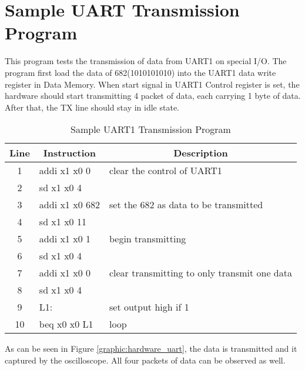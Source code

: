 \newpage
\section{Sample UART Transmission Program}
This program tests the transmission of data from UART1 on special I/O.
The program first load the data of 682(1010101010) into the UART1 data write register in Data Memory.
When start signal in UART1 Control register is set, the hardware should start transmitting 4 packet of data, each carrying 1 byte of data.
After that, the TX line should stay in idle state.

\begin{table}[!h]
    \centering
    \caption{Sample UART1 Transmission Program}
    \label{program:sample_uart}
    \begin{tabular}{|c|l|l|}
        \hline
        \textbf{Line} & \multicolumn{1}{c|}{\textbf{Instruction}} & \multicolumn{1}{c|}{\textbf{Description}}    \\ \hline
        1             & addi x1 x0 0                              & clear the control of UART1                   \\ \hline
        2             & sd x1 x0 4                                &                                              \\ \hline
        3             & addi x1 x0 682                            & set the 682 as data to be transmitted        \\ \hline
        4             & sd x1 x0 11                               &                                              \\ \hline
        5             & addi x1 x0 1                              & begin transmitting                           \\ \hline
        6             & sd x1 x0 4                                &                                              \\ \hline
        7             & addi x1 x0 0                              & clear transmitting to only transmit one data \\ \hline
        8             & sd x1 x0 4                                &                                              \\ \hline
        9             & L1:                                       & set output high if 1                         \\ \hline
        10            & beq x0 x0 L1                              & loop                                         \\ \hline
    \end{tabular}
\end{table}

As can be seen in Figure \ref{graphic:hardware_uart}, the data is transmitted and it captured by the oscilloscope.
All four packets of data can be observed as well.

